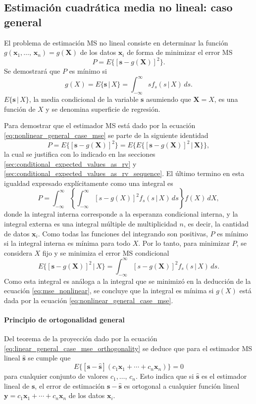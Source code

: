 \documentclass[a4paper]{report}
\newcommand{\X}{\mathbf{X}}
\newcommand{\x}{\mathbf{x}}
\newcommand{\y}{\mathbf{y}}
\newcommand{\s}{\mathbf{s}}
\begin{document}
\subsection{Estimación cuadrática media no lineal: caso general}

El problema de estimación MS no lineal consiste en determinar la función \(g(\x_1,\dots,\,\x_n)=g(\X)\) de los datos \(\x_i\) de forma de minimizar el error MS
\begin{equation}\label{eq:nonlinear_general_case_ms}
 P=E\{[\s-g(\X)]^2\}.
\end{equation}
Se demostrará que \(P\) es mínimo si
\begin{equation}\label{eq:nonlinear_general_case_mse}
 g(X)=E\{\s\,|\,X\}=\int_{-\infty}^{\infty}sf_s(s\,|\,X)\,ds.
\end{equation}
\(E\{\s\,|\,X\}\), la media condicional de la variable \(\s\) asumiendo que \(\X=X\), es una función de \(X\) y se denomina superficie de regresión. 

Para demostrar que el estimador MS está dado por la ecuación \ref{eq:nonlinear_general_case_mse} se parte de la siguiente identidad
\[
 P=E\{[\s-g(\X)]^2\}=E\{E\{[\s-g(\X)]^2\,|\,\X\}\},
\]
la cual se justifica con lo indicado en las secciones \ref{sec:conditional_expected_values_as_rv} y \ref{sec:conditional_expected_values_as_rv_sequence}. El último termino en esta igualdad expresado explícitamente como una integral es
\[
 P=\int_{-\infty}^{\infty}\left\{\int_{-\infty}^{\infty}[s-g(X)]^2f_s(s\,|\,X)\,ds\right\}f(X)\,dX,
\]
donde la integral interna corresponde a la esperanza condicional interna, y la integral externa es una integral múltiple de multiplicidad \(n\), es decir, la cantidad de datos \(\x_i\). Como todas las funciones del integrando son positivas, \(P\) es mínimo si la integral interna es mínima para todo \(X\). Por lo tanto, para minimizar \(P\), se considera \(X\) fijo y se minimiza el error MS condicional
\[
 E\{[\s-g(\X)]^2\,|\,X\}=\int_{-\infty}^{\infty}[s-g(\X)]^2f_s(s\,|\,X)\,ds.
\]
Como esta integral es análoga a la integral que se minimizó en la deducción de la ecuación \ref{eq:mse_nonlinear}, se concluye que la integral es mínima si \(g(X)\) está dada por la ecuación \ref{eq:nonlinear_general_case_mse}.

\paragraph{Principio de ortogonalidad general}

Del teorema de la proyección dado por la ecuación \ref{eq:linear_general_case_mse_orthogonality} se deduce que para el estimador MS lineal \(\hat{\s}\) se cumple que
\[
 E\{[\s-\hat{\s}](c_1\x_1+\cdots+c_n\x_n)\}=0
\]
para cualquier conjunto de valores \(c_1,\dots,\,c_n\). Esto indica que si \(\hat{\s}\) es el estimador lineal de \(\s\), el error de estimación \(\s-\hat{\s}\) es ortogonal a cualquier función lineal \(\y=c_1\x_1+\cdots+c_n\x_n\) de los datos \(\x_i\).
\end{document}
